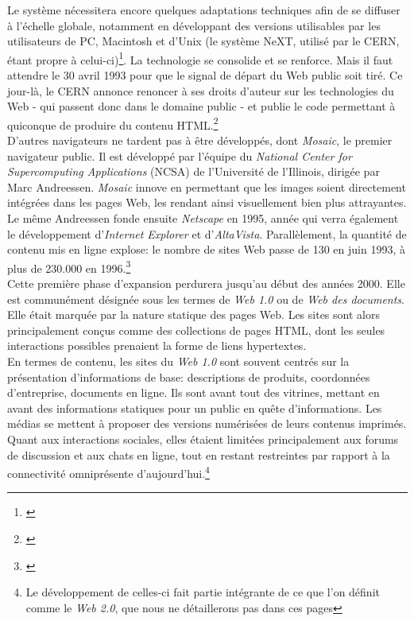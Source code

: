 \documentclass[a4paper,12pt,twoside]{book}
\begin{document}
Le système nécessitera encore quelques adaptations techniques afin de se diffuser à l'échelle globale, notamment en développant des versions utilisables par les utilisateurs de PC, Macintosh et d'Unix (le système NeXT, utilisé par le CERN, étant propre à celui-ci)\footnote{\cite[p.~55-56]{berners-leeWeavingWebOriginal2000}}. La technologie se consolide et se renforce. Mais il faut attendre le 30 avril 1993 pour que le signal de départ du Web public soit tiré. Ce jour-là, le CERN annonce renoncer à ses droits d'auteur sur les technologies du Web - qui passent donc dans le domaine public - et publie le code permettant à quiconque de produire du contenu HTML.\footnote{\cite[p.~87-88]{cardonCultureNumerique2019}}\\ 

D'autres navigateurs ne tardent pas à être développés, dont \textit{Mosaic}, le premier navigateur public. Il est développé par l'équipe du \textit{National Center for Supercomputing Applications} (NCSA) de l'Université de l'Illinois, dirigée par Marc Andreessen. \textit{Mosaic} innove en permettant que les images soient directement intégrées dans les pages Web, les rendant ainsi visuellement bien plus attrayantes. Le même Andreessen fonde ensuite \textit{Netscape} en 1995, année qui verra également le développement d'\textit{Internet Explorer} et d'\textit{AltaVista}. Parallèlement, la quantité de contenu mis en ligne explose: le nombre de sites Web passe de 130 en juin 1993, à plus de 230.000 en 1996.\footnote{\cite[p.~86-88]{cardonCultureNumerique2019}}\\

Cette première phase d'expansion perdurera jusqu'au début des années 2000. Elle est communément désignée sous les termes de \textit{Web 1.0} ou de \textit{Web des documents}. Elle était marquée par la nature statique des pages Web. Les sites sont alors principalement conçus comme des collections de pages HTML, dont les seules interactions possibles prenaient la forme de liens hypertextes.\\

En termes de contenu, les sites du \textit{Web 1.0} sont souvent centrés sur la présentation d'informations de base: descriptions de produits, coordonnées d'entreprise, documents en ligne. Ils sont avant tout des vitrines, mettant en avant des informations statiques pour un public en quête d'informations. Les médias se mettent à proposer des versions numérisées de leurs contenus imprimés. Quant aux interactions sociales, elles étaient limitées principalement aux forums de discussion et aux chats en ligne, tout en restant restreintes par rapport à la connectivité omniprésente d'aujourd'hui.\footnote{Le développement de celles-ci fait partie intégrante de ce que l'on définit comme le \textit{Web 2.0}, que nous ne détaillerons pas dans ces pages}\\
\end{document}
